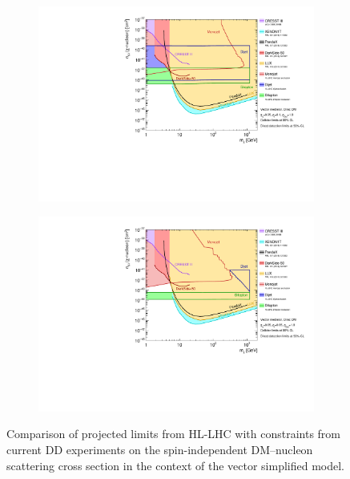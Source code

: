 \documentclass[11pt]{article}
\begin{document}
\begin{figure}
     \centering
     \begin{subfigure}[b]{0.8\textwidth}
         \centering
         \includegraphics[width=\textwidth]{SummaryPlots-EF10/figures/directdetection/hl-lhc/DD_Vector_contour_monojet_gq0p25_gdm1p0_gl0p1_nucleon.pdf}
         \caption{}
         \label{subfig:dd-hl-lhc-a1}
     \end{subfigure}
     
     \begin{subfigure}[b]{0.8\textwidth}
         \centering
         \includegraphics[width=\textwidth]{SummaryPlots-EF10/figures/directdetection/hl-lhc/DD_Vector_contour_monojet_gq0p05_gdm1p0_gl0p05_nucleon.pdf}
         \caption{}
         \label{subfig:dd-hl-lhc-vec}       
     \end{subfigure}
        \caption{Comparison of projected limits from HL-LHC with constraints from current DD experiments on the spin-independent DM–nucleon scattering cross section in the context of the vector simplified model.}
        \label{fig:hl-lhc-dd-separate-si}
\end{figure}
\end{document}

